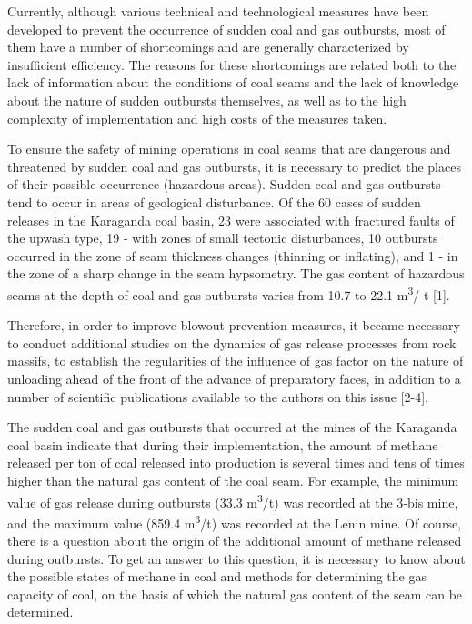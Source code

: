 \begin{multicols}{2}
Currently, although various technical and technological measures have
been developed to prevent the occurrence of sudden coal and gas
outbursts, most of them have a number of shortcomings and are generally
characterized by insufficient efficiency. The reasons for these
shortcomings are related both to the lack of information about the
conditions of coal seams and the lack of knowledge about the nature of
sudden outbursts themselves, as well as to the high complexity of
implementation and high costs of the measures taken.

To ensure the safety of mining operations in coal seams that are
dangerous and threatened by sudden coal and gas outbursts, it is
necessary to predict the places of their possible occurrence (hazardous
areas). Sudden coal and gas outbursts tend to occur in areas of
geological disturbance. Of the 60 cases of sudden releases in the
Karaganda coal basin, 23 were associated with fractured faults of the
upwash type, 19 - with zones of small tectonic disturbances, 10
outbursts occurred in the zone of seam thickness changes (thinning or
inflating), and 1 - in the zone of a sharp change in the seam
hypsometry. The gas content of hazardous seams at the depth of coal and
gas outbursts varies from 10.7 to 22.1 m\textsuperscript{3}/ t {[}1{]}.

Therefore, in order to improve blowout prevention measures, it became
necessary to conduct additional studies on the dynamics of gas release
processes from rock massifs, to establish the regularities of the
influence of gas factor on the nature of unloading ahead of the front of
the advance of preparatory faces, in addition to a number of scientific
publications available to the authors on this issue {[}2-4{]}.

The sudden coal and gas outbursts that occurred at the mines of the
Karaganda coal basin indicate that during their implementation, the
amount of methane released per ton of coal released into production is
several times and tens of times higher than the natural gas content of
the coal seam. For example, the minimum value of gas release during
outbursts (33.3 m\textsuperscript{3}/t) was recorded at the 3‑bis mine,
and the maximum value (859.4 m\textsuperscript{3}/t) was recorded at the
Lenin mine. Of course, there is a question about the origin of the
additional amount of methane released during outbursts. To get an answer
to this question, it is necessary to know about the possible states of
methane in coal and methods for determining the gas capacity of coal, on
the basis of which the natural gas content of the seam can be
determined.


\end{multicols}
